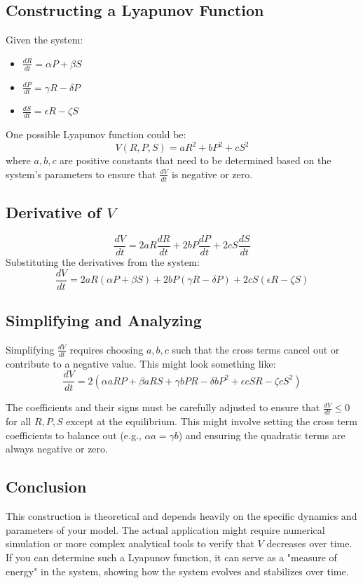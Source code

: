 \documentclass{article}
\begin{document}
\subsection*{Constructing a Lyapunov Function}
Given the system:
\begin{itemize}
  \item \( \frac{dR}{dt} = \alpha P + \beta S \)
  \item \( \frac{dP}{dt} = \gamma R - \delta P \)
  \item \( \frac{dS}{dt} = \epsilon R - \zeta S \)
\end{itemize}

One possible Lyapunov function could be:
\[ V(R, P, S) = aR^2 + bP^2 + cS^2 \]
where \( a, b, c \) are positive constants that need to be determined based on the system's parameters to ensure that \( \frac{dV}{dt} \) is negative or zero.

\subsection*{Derivative of \( V \)}
\[ \frac{dV}{dt} = 2aR\frac{dR}{dt} + 2bP\frac{dP}{dt} + 2cS\frac{dS}{dt} \]
Substituting the derivatives from the system:
\[ \frac{dV}{dt} = 2aR(\alpha P + \beta S) + 2bP(\gamma R - \delta P) + 2cS(\epsilon R - \zeta S) \]

\subsection*{Simplifying and Analyzing}
Simplifying \( \frac{dV}{dt} \) requires choosing \( a, b, c \) such that the cross terms cancel out or contribute to a negative value. This might look something like:
\[ \frac{dV}{dt} = 2(\alpha aR P + \beta aRS + \gamma bPR - \delta bP^2 + \epsilon cSR - \zeta cS^2) \]

The coefficients and their signs must be carefully adjusted to ensure that \( \frac{dV}{dt} \leq 0 \) for all \( R, P, S \) except at the equilibrium. This might involve setting the cross term coefficients to balance out (e.g., \( \alpha a = \gamma b \)) and ensuring the quadratic terms are always negative or zero.

\subsection*{Conclusion}
This construction is theoretical and depends heavily on the specific dynamics and parameters of your model. The actual application might require numerical simulation or more complex analytical tools to verify that \( V \) decreases over time. If you can determine such a Lyapunov function, it can serve as a "measure of energy" in the system, showing how the system evolves and stabilizes over time.
\end{document}
